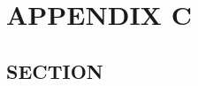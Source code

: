 \documentclass[../main/main]{subfiles}
\begin{document}
\chapter{APPENDIX C}

\section{SECTION}
\end{document}
